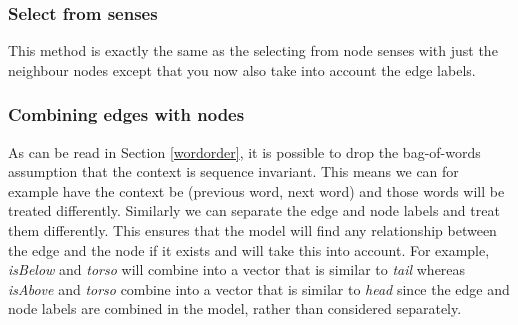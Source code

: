 \documentclass{article}
\begin{document}
  \subsubsection{Select from senses}
  This method is exactly the same as the selecting from node senses with just the neighbour nodes except that you now also take into account the edge labels.
  \subsubsection{Combining edges with nodes}
  As can be read in Section \ref{wordorder}, it is possible to drop the bag-of-words assumption that the context is sequence invariant.
  This means we can for example have the context be (previous word, next word) and those words will be treated differently. Similarly we can separate the edge and node labels and treat them differently. This ensures that the model will find any relationship between the edge and the node if it exists and will take this into account. For example, \emph{isBelow} and \emph{torso} will combine into a vector that is similar to \emph{tail} whereas \emph{isAbove} and \emph{torso} combine into a vector that is similar to \emph{head} since the edge and node labels are combined in the model, rather than considered separately.
\end{document}
